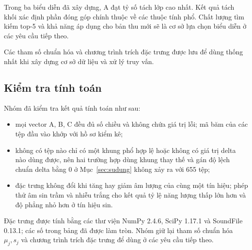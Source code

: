 \documentclass[11pt,a4paper]{article}
\begin{document}
Trong ba biểu diễn đã xây dựng, A đạt tỷ số tách lớp cao nhất. Kết quả tách khối xác định phần đóng góp chính thuộc về các thuộc tính phổ. Chất lượng tìm kiếm top-5 và khả năng áp dụng cho bản thu mới sẽ là cơ sở lựa chọn biểu diễn ở các yêu cầu tiếp theo.

Các tham số chuẩn hóa và chương trình trích đặc trưng được lưu để dùng thống nhất khi xây dựng cơ sở dữ liệu và xử lý truy vấn.

\subsection{Kiểm tra tính toán}
Nhóm đã kiểm tra kết quả tính toán như sau:
\begin{itemize}
\item mọi vector A, B, C đều đủ số chiều và không chứa giá trị lỗi; mã băm của các tệp đầu vào khớp với hồ sơ kiểm kê;
\item không có tệp nào chỉ có một khung phổ hợp lệ hoặc không có giá trị delta nào dùng được, nên hai trường hợp dùng khung thay thế và gán độ lệch chuẩn delta bằng 0 ở Mục~\ref{sec:sudung} không xảy ra với 655 tệp;
\item đặc trưng không đổi khi tăng hay giảm âm lượng của cùng một tín hiệu; phép thử âm sin trầm và nhiễu trắng cho kết quả tỷ lệ năng lượng thấp lớn hơn và độ phẳng nhỏ hơn ở tín hiệu sin.
\end{itemize}

Đặc trưng được tính bằng các thư viện NumPy 2.4.6, SciPy 1.17.1 và SoundFile 0.13.1; các số trong bảng đã được làm tròn. Nhóm giữ lại tham số chuẩn hóa $\mu_j, s_j$ và chương trình trích đặc trưng để dùng ở các yêu cầu tiếp theo.
\clearpage
\end{document}
